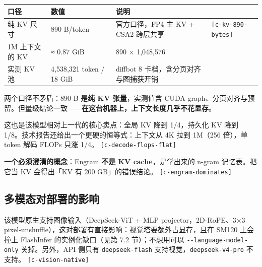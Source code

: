 \begin{table}[t]
\centering
\footnotesize
\setlength{\tabcolsep}{4pt}
\label{tab:2}
\begin{tabularx}{\textwidth}{llXl}
\toprule
口径 & 数值 & 说明 &  \\
\midrule
纯 KV 尺寸 & 890 B/token & 官方口径，FP4 主 KV + CSA2 跨层共享 & {\scriptsize\texttt{[c-\hspace{0pt}kv-\hspace{0pt}890-\hspace{0pt}bytes]}} \\
1M 上下文的 KV & ≈ 0.87 GiB & 890 × 1,048,576 &  \\
实测 KV 池 & 4,538,321 token / 18 GiB & diffbot 8 卡档，含分页对齐与图捕获开销 &  \\
\bottomrule
\end{tabularx}
\end{table}

两个口径不矛盾：890 B 是\textbf{纯 KV 张量}，实测值含 CUDA graph、分页对齐与预留。但量级结论一致——\textbf{在这台机器上，上下文长度几乎不花显存}。


这也是该模型相对上一代的核心卖点：全局 KV 降到 1/4，持久化 KV 降到 1/8。技术报告还给出一个更硬的恒等式：上下文从 4K 拉到 1M（256 倍），单 token 解码 FLOPs 只涨 1/4。 {\scriptsize\texttt{[c-\hspace{0pt}decode-\hspace{0pt}flops-\hspace{0pt}flat]}}


\textbf{一个必须澄清的概念}：Engram \textbf{不是 KV cache}，是学出来的 n-gram 记忆表。把它当 KV 会得出「KV 有 200 GB」的错误结论。 {\scriptsize\texttt{[c-\hspace{0pt}engram-\hspace{0pt}dominates]}}


\subsection{多模态对部署的影响}

该模型原生支持图像输入（DeepSeek-ViT + MLP projector，2D-RoPE、3×3 pixel-unshuffle），这对部署有直接影响：视觉塔要额外占显存，且在 SM120 上会撞上 FlashInfer 的实例化缺口（见第 7.2 节）；不想用可以 \texttt{-\allowbreak{}-\allowbreak{}language-\allowbreak{}model-\allowbreak{}only} 关掉。另外，API 侧只有 \texttt{deepseek-\allowbreak{}flash} 支持视觉，\texttt{deepseek-\allowbreak{}v4-\allowbreak{}pro} 不支持。 {\scriptsize\texttt{[c-\hspace{0pt}vision-\hspace{0pt}native]}}


